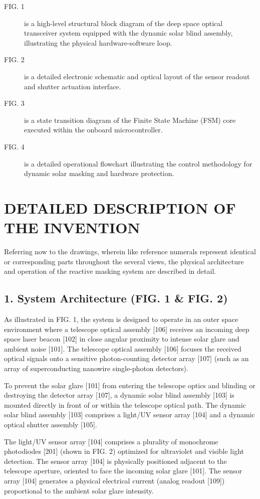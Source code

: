 \documentclass[12pt,a4paper]{article}
\begin{document}
\begin{description}
    \item[FIG. 1] is a high-level structural block diagram of the deep space optical transceiver system equipped with the dynamic solar blind assembly, illustrating the physical hardware-software loop.
    \item[FIG. 2] is a detailed electronic schematic and optical layout of the sensor readout and shutter actuation interface.
    \item[FIG. 3] is a state transition diagram of the Finite State Machine (FSM) core executed within the onboard microcontroller.
    \item[FIG. 4] is a detailed operational flowchart illustrating the control methodology for dynamic solar masking and hardware protection.
\end{description}

\section*{DETAILED DESCRIPTION OF THE INVENTION}
Referring now to the drawings, wherein like reference numerals represent identical or corresponding parts throughout the several views, the physical architecture and operation of the reactive masking system are described in detail.

\subsection*{1. System Architecture (FIG. 1 \& FIG. 2)}
As illustrated in FIG. 1, the system is designed to operate in an outer space environment where a telescope optical assembly [106] receives an incoming deep space laser beacon [102] in close angular proximity to intense solar glare and ambient noise [101]. The telescope optical assembly [106] focuses the received optical signals onto a sensitive photon-counting detector array [107] (such as an array of superconducting nanowire single-photon detectors).

To prevent the solar glare [101] from entering the telescope optics and blinding or destroying the detector array [107], a dynamic solar blind assembly [103] is mounted directly in front of or within the telescope optical path. The dynamic solar blind assembly [103] comprises a light/UV sensor array [104] and a dynamic optical shutter assembly [105].

The light/UV sensor array [104] comprises a plurality of monochrome photodiodes [201] (shown in FIG. 2) optimized for ultraviolet and visible light detection. The sensor array [104] is physically positioned adjacent to the telescope aperture, oriented to face the incoming solar glare [101]. The sensor array [104] generates a physical electrical current (analog readout [109]) proportional to the ambient solar glare intensity.
\end{document}
